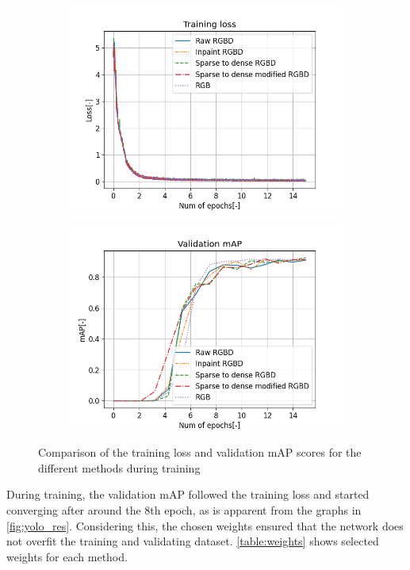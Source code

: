 \documentclass[twoside]{ctuthesis}
\theoremstyle{plain}
\theoremstyle{definition}
\theoremstyle{note}
\begin{document}
\begin{figure}
	\centering
	\begin{subfigure}[b]{0.7\textwidth}
		\centering
		\includegraphics[width=\textwidth]{train_loss.png}
	\end{subfigure}
	\hfill
	\begin{subfigure}[b]{0.7\textwidth}
		\centering
		\includegraphics[width=\textwidth]{validation_mAP.png}
	\end{subfigure}
	\caption{Comparison of the training loss and validation mAP scores for the different methods during training}
	\label{fig:yolo_res}
\end{figure}
During training, the validation mAP followed the training loss and started converging after around the 8th epoch, as is apparent from the graphs in \autoref{fig:yolo_res}. Considering this, the chosen weights ensured that the network does not overfit the training and validating dataset. \autoref{table:weights} shows selected weights for each method.
\end{document}
